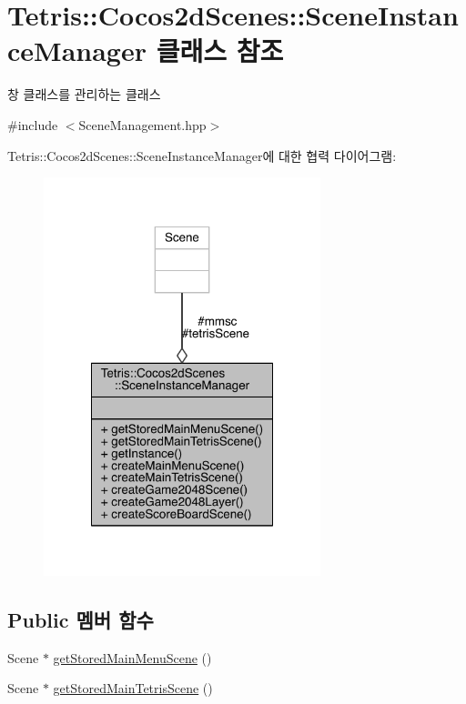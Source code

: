 \hypertarget{class_tetris_1_1_cocos2d_scenes_1_1_scene_instance_manager}{}\section{Tetris\+:\+:Cocos2d\+Scenes\+:\+:Scene\+Instance\+Manager 클래스 참조}
\label{class_tetris_1_1_cocos2d_scenes_1_1_scene_instance_manager}


창 클래스를 관리하는 클래스  




{\ttfamily \#include $<$Scene\+Management.\+hpp$>$}



Tetris\+:\+:Cocos2d\+Scenes\+:\+:Scene\+Instance\+Manager에 대한 협력 다이어그램\+:
\nopagebreak
\begin{figure}[H]
\begin{center}
\leavevmode
\includegraphics[width=228pt]{db/de0/class_tetris_1_1_cocos2d_scenes_1_1_scene_instance_manager__coll__graph}
\end{center}
\end{figure}
\subsection*{Public 멤버 함수}
\begin{DoxyCompactItemize}
\item 
Scene $\ast$ \hyperlink{class_tetris_1_1_cocos2d_scenes_1_1_scene_instance_manager_ac7f573b16a4fd8746fd1f397dbfd01c2}{get\+Stored\+Main\+Menu\+Scene} ()
\item 
Scene $\ast$ \hyperlink{class_tetris_1_1_cocos2d_scenes_1_1_scene_instance_manager_af79d0ad920411ed2b87545b49bc32e6c}{get\+Stored\+Main\+Tetris\+Scene} ()
\end{DoxyCompactItemize}
